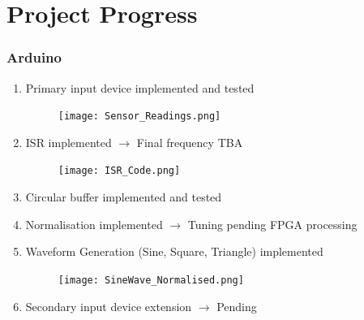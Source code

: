 \documentclass{article}
\begin{document}
\newpage
\section{Project Progress}
\subsubsection{Arduino}
\begin{enumerate}
    \item Primary input device implemented and tested
    \begin{figure}[H]
    \centering
    \texttt{[image: Sensor\_Readings.png]}
    \end{figure}
    \item ISR implemented $\rightarrow$ Final frequency TBA
    \begin{figure}[H]
    \centering
    \texttt{[image: ISR\_Code.png]}
    \end{figure}
    \item Circular buffer implemented and tested
    \item Normalisation implemented $\rightarrow$ Tuning pending FPGA processing
    \item Waveform Generation (Sine, Square, Triangle) implemented
    \begin{figure}[H]
    \centering
    \texttt{[image: SineWave\_Normalised.png]}
    \end{figure}
    \item Secondary input device extension $\rightarrow$ Pending
\end{enumerate}
\end{document}
